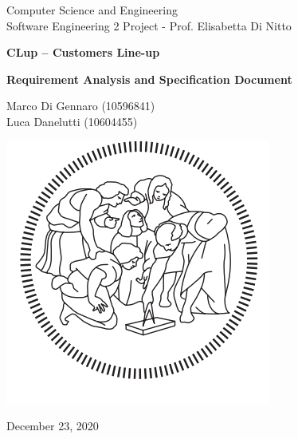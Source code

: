 \documentclass[10pt,openany]{book}
\begin{document}
\begin{titlepage}
    \clearpage
    \thispagestyle{empty}
	\centering
	\vspace{2cm}

	{\normalsize  Computer Science and Engineering\\Software Engineering 2 Project - Prof. Elisabetta Di Nitto\par}
	\vspace{3cm}
	{\Huge \textbf{CLup – Customers Line-up}} \\
	\vspace{1cm}
	{\large \textbf{Requirement Analysis and Specification
    Document} \par}
	\vspace{4cm}
	{\normalsize Marco Di Gennaro (10596841)\\Luca Danelutti (10604455)  \par}
	\vspace{2cm}

    \includegraphics[scale=0.4]{images/Logo_Politecnico_Milano.png}
    
    \vspace{2cm}

	{\normalsize December 23, 2020 \par}
	
	\pagebreak

\end{titlepage}

\tableofcontents{}

\clearpage

\mainmatter
\end{document}
